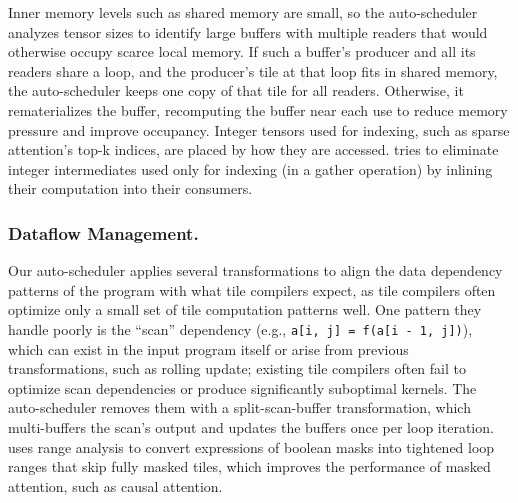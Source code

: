 Inner memory levels such as shared memory are small,
so the auto-scheduler analyzes tensor sizes to identify
large buffers with multiple readers that would otherwise occupy scarce local memory.
If such a buffer's producer and all its readers share a loop, and the producer's
tile at that loop fits in shared memory, the auto-scheduler keeps one copy of
that tile for all readers. Otherwise, it rematerializes the buffer,
recomputing the buffer near each use to reduce memory pressure and improve occupancy.
Integer tensors used for indexing, such as sparse attention's top-k indices,
are placed by how they are accessed.
\NAME{} tries to eliminate integer intermediates used only for indexing (in a gather
operation) by inlining their computation into their consumers.


\subsubsection{Dataflow Management.}\label{sec:regularize}
Our auto-scheduler applies several transformations to align the data dependency patterns
of the program with what tile compilers expect,
as tile compilers often optimize only a small set of tile computation patterns well.
One pattern they handle poorly is the ``scan'' dependency
(e.g., \texttt{a[i, j] = f(a[i - 1, j])}),
which can exist in the input program itself
or arise from previous transformations, such as rolling update;
existing tile compilers often fail to optimize scan dependencies
or produce significantly suboptimal kernels.
The auto-scheduler removes them with a split-scan-buffer transformation,
which multi-buffers the scan's output and updates the buffers once per loop iteration.
\NAME{} uses range analysis to convert expressions of boolean masks
into tightened loop ranges that skip fully masked tiles,
which improves the performance of masked attention, such as causal attention.

